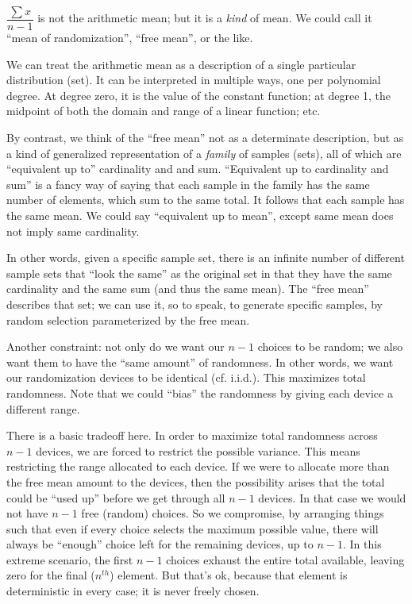 \begin{ednote}
  \(\dfrac{\sum x}{n-1}\) is not the arithmetic mean; but it is a
  \emph{kind} of mean.  We could call it ``mean of randomization'',
  ``free mean'', or the like.

  We can treat the arithmetic mean as a description of a single
  particular distribution (set).  It can be interpreted in multiple
  ways, one per polynomial degree.  At degree zero, it is the value of
  the constant function; at degree 1, the midpoint of both the domain
  and range of a linear function; etc.

  By contrast, we think of the ``free mean'' not as a determinate
  description, but as a kind of generalized representation of a
  \emph{family} of samples (sets), all of which are ``equivalent up
  to'' cardinality and and sum.  ``Equivalent up to cardinality and
  sum'' is a fancy way of saying that each sample in the family has
  the same number of elements, which sum to the same total.  It
  follows that each sample has the same mean.  We could say
  ``equivalent up to mean'', except same mean does not imply same
  cardinality.

  In other words, given a specific sample set, there is an infinite
  number of different sample sets that ``look the same'' as the
  original set in that they have the same cardinality and the same sum
  (and thus the same mean).  The ``free mean'' describes that set; we
  can use it, so to speak, to generate specific samples, by random
  selection parameterized by the free mean.

  Another constraint: not only do we want our \(n-1\) choices to be
  random; we also want them to have the ``same amount'' of randomness.
  In other words, we want our randomization devices to be identical
  (cf. i.i.d.).  This maximizes total randomness.  Note that we could
  ``bias'' the randomness by giving each device a different range.

  There is a basic tradeoff here.  In order to maximize total
  randomness across \(n-1\) devices, we are forced to restrict the
  possible variance.  This means restricting the range allocated to
  each device.  If we were to allocate more than the free mean amount
  to the devices, then the possibility arises that the total could be
  ``used up'' before we get through all \(n-1\) devices.  In that case
  we would not have \(n-1\) free (random) choices.  So we compromise,
  by arranging things such that even if every choice selects the
  maximum possible value, there will always be ``enough'' choice left
  for the remaining devices, up to \(n-1\).  In this extreme scenario,
  the first \(n-1\) choices exhaust the entire total available,
  leaving zero for the final (\(n^{th}\)) element.  But that's ok,
  because that element is deterministic in every case; it is never
  freely chosen.


\end{ednote}
